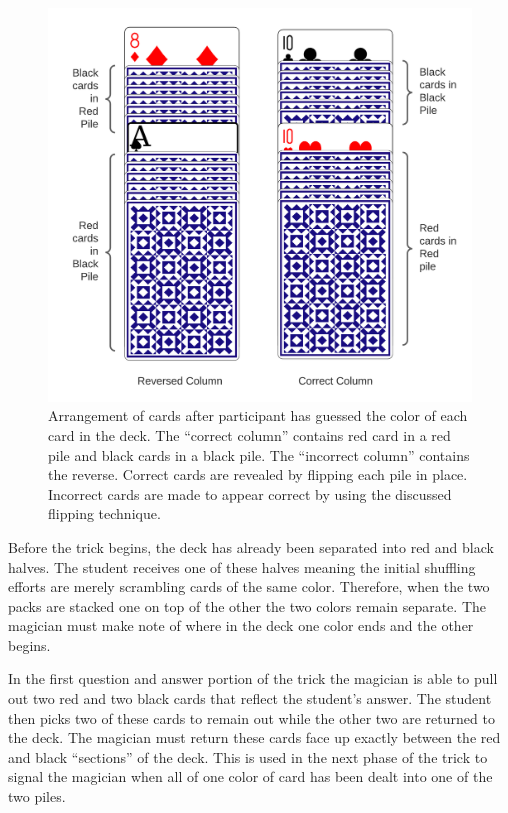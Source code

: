 \begin{figure}[H]
\centering
\includegraphics[scale=.6]{images/Trick1}
\caption{Arrangement of cards after participant has guessed the color of each
card in the deck.  The ``correct column'' contains red card in a red pile and
black cards in a black pile.  The ``incorrect column'' contains the reverse.
Correct cards are revealed by flipping each pile in place.  Incorrect cards are
made to appear correct by using the discussed flipping technique.}
\label{fig:trick1}
\end{figure}

Before the trick begins, the deck has already
been separated into red and black halves.
The student receives one of these halves
meaning
the initial shuffling efforts are merely scrambling
cards of the same color.
Therefore, when the two packs are
stacked one on top of the other the two colors remain
separate.
The magician must make note of where in the deck
one color ends and the other begins.

In the first question and answer portion of the trick the magician is able to
pull out two red and two black cards that reflect the student's answer.  The
student then picks two of these cards to remain out while the other two are
returned to the deck.  The magician must return these cards face
up exactly between the red and black ``sections'' of the deck.
This is used in the next phase of the
trick to signal the magician when all of one color of card
has been dealt into one of the two piles.

